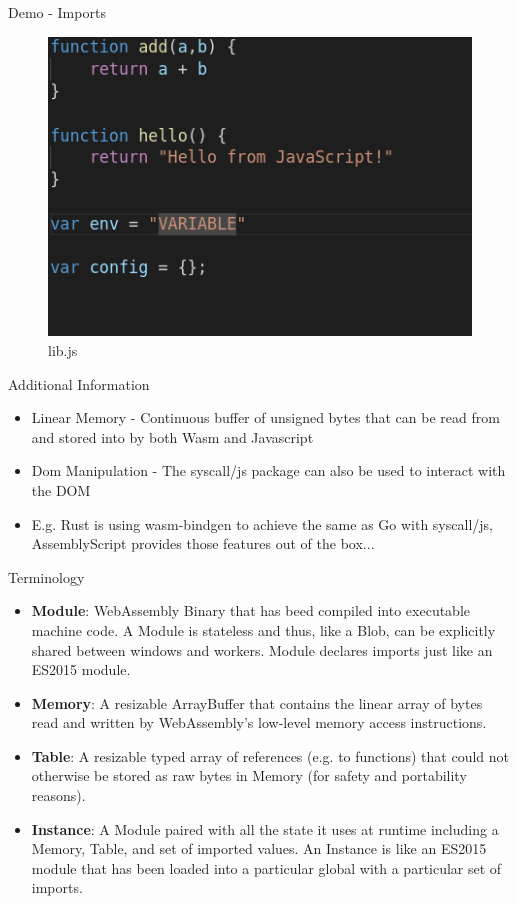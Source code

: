 \documentclass{beamer}
\begin{document}
\begin{frame}{Demo - Imports}
\begin{figure}
    \includegraphics[scale=0.4]{./images/libjs.png}
    \caption{lib.js}
\end{figure}

\end{frame}

\begin{frame}{Additional Information}
\begin{itemize}
    \item Linear Memory - Continuous buffer of unsigned bytes that can be read from and stored into by both Wasm and Javascript
    \item Dom Manipulation - The syscall/js package can also be used to interact with the DOM
    \item E.g. Rust is using wasm-bindgen to achieve the same as Go with syscall/js, AssemblyScript provides those features out of the box...
\end{itemize}
\end{frame}

\begin{frame}{Terminology}
\begin{itemize} 
    \item \textbf{Module}: WebAssembly Binary that has beed compiled into executable machine code. A Module is stateless and thus, like a Blob, can be explicitly shared between windows and workers. Module declares imports just like an ES2015 module.
    \item \textbf{Memory}: A resizable ArrayBuffer that contains the linear array of bytes read and written by WebAssembly’s low-level memory access instructions.
    \item \textbf{Table}: A resizable typed array of references (e.g. to functions) that could not otherwise be stored as raw bytes in Memory (for safety and portability reasons).
    \item \textbf{Instance}: A Module paired with all the state it uses at runtime including a Memory, Table, and set of imported values. An Instance is like an ES2015 module that has been loaded into a particular global with a particular set of imports.
\end{itemize}
\end{frame}
\end{document}
